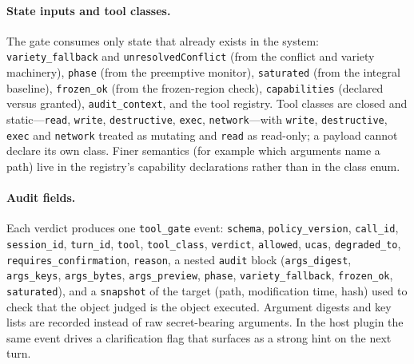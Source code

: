 \paragraph{State inputs and tool classes.} The gate consumes only state that
already exists in the system: \texttt{variety\_fallback} and
\texttt{unresolvedConflict} (from the conflict and variety machinery),
\texttt{phase} (from the preemptive monitor), \texttt{saturated} (from the
integral baseline), \texttt{frozen\_ok} (from the frozen-region check),
\texttt{capabilities} (declared versus granted), \texttt{audit\_context}, and the
tool registry. Tool classes are closed and static---\texttt{read}, \texttt{write},
\texttt{destructive}, \texttt{exec}, \texttt{network}---with \texttt{write},
\texttt{destructive}, \texttt{exec} and \texttt{network} treated as mutating and
\texttt{read} as read-only; a payload cannot declare its own class. Finer
semantics (for example which arguments name a path) live in the registry's
capability declarations rather than in the class enum.

\paragraph{Audit fields.} Each verdict produces one \texttt{tool\_gate} event:
\texttt{schema}, \texttt{policy\_version}, \texttt{call\_id},
\texttt{session\_id}, \texttt{turn\_id}, \texttt{tool}, \texttt{tool\_class},
\texttt{verdict}, \texttt{allowed}, \texttt{ucas}, \texttt{degraded\_to},
\texttt{requires\_\allowbreak{}confirmation}, \texttt{reason}, a nested
\texttt{audit} block (\texttt{args\_digest}, \texttt{args\_keys},
\texttt{args\_bytes}, \texttt{args\_preview}, \texttt{phase},
\texttt{variety\_fallback}, \texttt{frozen\_ok}, \texttt{saturated}), and a
\texttt{snapshot} of the target (path, modification time, hash) used to check
that the object judged is the object executed. Argument digests and key lists
are recorded instead of raw secret-bearing arguments. In the host plugin the
same event drives a clarification flag that surfaces as a strong hint on the next
turn.

